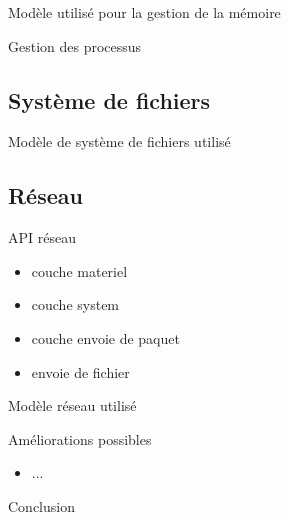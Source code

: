 \documentclass{beamer}
\begin{document}
\begin{frame}{Modèle utilisé pour la gestion de la mémoire}
    
\end{frame}

\begin{frame}{Gestion des processus}

\end{frame}

\subsection{Système de fichiers}
\begin{frame}{Modèle de système de fichiers utilisé}
    
\end{frame}

\subsection{Réseau}

\begin{frame}{API réseau}
    \begin{itemize}
        \item couche materiel
        \item couche system
        \item couche envoie de paquet
        \item envoie de fichier
    \end{itemize}
\end{frame}

\begin{frame}{Modèle réseau utilisé}
    
\end{frame}

\begin{frame}{Améliorations possibles}
    \begin{itemize}
        \item ...
    \end{itemize}
\end{frame}

\begin{frame}{Conclusion}
\end{frame}
\end{document}
